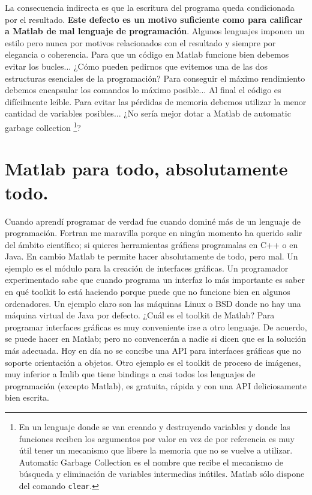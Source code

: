 La consecuencia indirecta es que la escritura del programa queda condicionada
por el resultado. \textbf{Este defecto es un motivo suficiente como
para calificar a Matlab de mal lenguaje de programación}. Algunos
lenguajes imponen un estilo pero nunca por motivos relacionados con
el resultado y siempre por elegancia o coherencia. Para que un código
en Matlab funcione bien debemos evitar los bucles... ¿Cómo pueden
pedirnos que evitemos una de las dos estructuras esenciales de la
programación? Para conseguir el máximo rendimiento debemos encapsular
los comandos lo máximo posible... Al final el código es difícilmente
leíble. Para evitar las pérdidas de memoria debemos utilizar la menor
cantidad de variables posibles... ¿No sería mejor dotar a Matlab de
automatic garbage collection%
\footnote{En un lenguaje donde se van creando y destruyendo variables y donde
las funciones reciben los argumentos por valor en vez de por referencia
es muy útil tener un mecanismo que libere la memoria que no se vuelve
a utilizar. Automatic Garbage Collection es el nombre que recibe el
mecanismo de búsqueda y eliminación de variables intermedias inútiles.
Matlab sólo dispone del comando \texttt{clear}.%
}?


\section{Matlab para todo, absolutamente todo.}

Cuando aprendí programar de verdad fue cuando dominé más de un lenguaje
de programación. Fortran me maravilla porque en ningún momento ha
querido salir del ámbito científico; si quieres herramientas gráficas
programalas en C++ o en Java. En cambio Matlab te permite hacer absolutamente
de todo, pero mal. Un ejemplo es el módulo para la creación de interfaces
gráficas. Un programador experimentado sabe que cuando programa un
interfaz lo más importante es saber en qué toolkit lo está haciendo
porque puede que no funcione bien en algunos ordenadores. Un ejemplo
claro son las máquinas Linux o BSD donde no hay una máquina virtual
de Java por defecto. ¿Cuál es el toolkit de Matlab? Para programar
interfaces gráficas es muy conveniente irse a otro lenguaje. De acuerdo,
se puede hacer en Matlab; pero no convencerán a nadie si dicen que
es la solución más adecuada. Hoy en día no se concibe una API para
interfaces gráficas que no soporte orientación a objetos. Otro ejemplo
es el toolkit de proceso de imágenes, muy inferior a Imlib que tiene
bindings a casi todos los lenguajes de programación (excepto Matlab),
es gratuita, rápida y con una API deliciosamente bien escrita.\\

